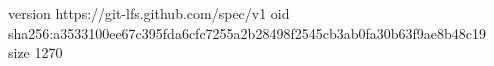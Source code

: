 version https://git-lfs.github.com/spec/v1
oid sha256:a3533100ee67c395fda6cfc7255a2b28498f2545cb3ab0fa30b63f9ae8b48c19
size 1270
